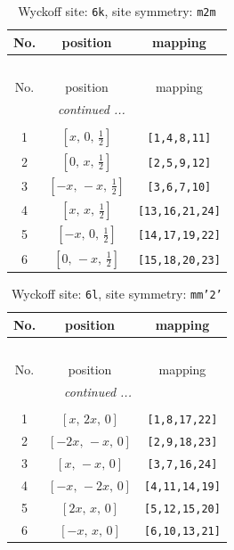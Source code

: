 \documentclass[fleqn,8pt]{jsarticle}
\begin{document}
\renewcommand{\arraystretch}{1.2}
\begin{longtable}{ccc}
\caption{Wyckoff site: {\tt 6k}, site symmetry: {\tt m2m}}
 \\
 \hline \hline
No. & position & mapping \\ \hline \endfirsthead

\multicolumn{2}{l}{\tablename\ \thetable{}} \\
 \hline \hline
No. & position & mapping \\ \hline \endhead

 \hline \hline
\multicolumn{2}{r}{\footnotesize\it continued ...} \\ \endfoot

 \hline \hline
\multicolumn{2}{r}{} \\ \endlastfoot

1 & $\left[ x,\, 0,\, \frac{1}{2} \right]$ & {\tt [1,4,8,11]} \\ \hline
2 & $\left[ 0,\, x,\, \frac{1}{2} \right]$ & {\tt [2,5,9,12]} \\ \hline
3 & $\left[ - x,\, - x,\, \frac{1}{2} \right]$ & {\tt [3,6,7,10]} \\ \hline
4 & $\left[ x,\, x,\, \frac{1}{2} \right]$ & {\tt [13,16,21,24]} \\ \hline
5 & $\left[ - x,\, 0,\, \frac{1}{2} \right]$ & {\tt [14,17,19,22]} \\ \hline
6 & $\left[ 0,\, - x,\, \frac{1}{2} \right]$ & {\tt [15,18,20,23]} \\
\end{longtable}
\renewcommand{\arraystretch}{1.2}
\begin{longtable}{ccc}
\caption{Wyckoff site: {\tt 6l}, site symmetry: {\tt mm'2'}}
 \\
 \hline \hline
No. & position & mapping \\ \hline \endfirsthead

\multicolumn{2}{l}{\tablename\ \thetable{}} \\
 \hline \hline
No. & position & mapping \\ \hline \endhead

 \hline \hline
\multicolumn{2}{r}{\footnotesize\it continued ...} \\ \endfoot

 \hline \hline
\multicolumn{2}{r}{} \\ \endlastfoot

1 & $\left[ x,\, 2 x,\, 0 \right]$ & {\tt [1,8,17,22]} \\ \hline
2 & $\left[ - 2 x,\, - x,\, 0 \right]$ & {\tt [2,9,18,23]} \\ \hline
3 & $\left[ x,\, - x,\, 0 \right]$ & {\tt [3,7,16,24]} \\ \hline
4 & $\left[ - x,\, - 2 x,\, 0 \right]$ & {\tt [4,11,14,19]} \\ \hline
5 & $\left[ 2 x,\, x,\, 0 \right]$ & {\tt [5,12,15,20]} \\ \hline
6 & $\left[ - x,\, x,\, 0 \right]$ & {\tt [6,10,13,21]} \\
\end{longtable}
\end{document}
